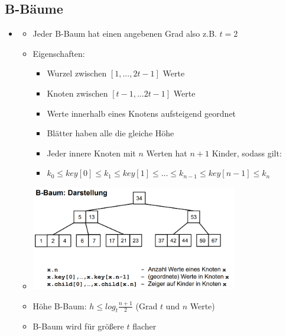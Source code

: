 \documentclass[
    12pt,
    a4paper,
    ngerman,
    color=3b,%
    marginpar=false,
    colorback=false,
    leqno,
]{tudaexercise}
\begin{document}
    \subsection{B-Bäume}\label{B-Baeume}
    \begin{itemize}
        \item {}
            \begin{itemize}
                \item Jeder B-Baum hat einen angebenen Grad also z.B. $t=2$
                \item Eigenschaften:
                    \begin{itemize}
                        \item Wurzel zwischen $[1,...,2t-1]$ Werte
                        \item Knoten zwischen $[t-1,...2t-1]$ Werte
                        \item Werte innerhalb eines Knotens aufsteigend geordnet
                        \item Blätter haben alle die gleiche Höhe
                        \item Jeder innere Knoten mit $n$ Werten hat $n+1$ Kinder, sodass gilt:
                        \item[] $k_0 \leq key[0] \leq k_1 \leq key[1] \leq ... \leq k_{n-1} \leq key[n-1] \leq k_n$
                    \end{itemize}
                \item[] \includegraphics[width=9cm]{pictures/bbaum.PNG}
                \item Höhe B-Baum: $h \leq log_t \frac{n+1}{2}$ (Grad $t$ und $n$ Werte)
                \item B-Baum wird für größere $t$ flacher
            \end{itemize}
        

\end{itemize}
\end{document}
